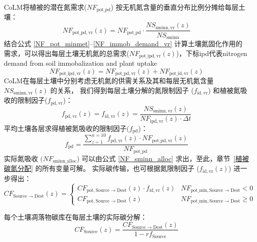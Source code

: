 CoLM将植被的潜在氮需求($NF_{\mathrm{pot\_{pd}}}$) 按无机氮含量的垂直分布比例分摊给每层土壤：
\begin{equation}
  NF_{\mathrm{pot\_{pd},vr}}(z)=NF_{\mathrm{pot\_{pd}}}\cdot\frac{NS_{\mathrm{sminn,vr}}(z)}{NS_{\mathrm{sminn}}}
\end{equation}
结合公式 \eqref{NF_pot_minmet}--\eqref{NF_immob_demand_vr} 计算土壤氮固化作用的需求，可以得出每层土壤无机氮的总需求($NF_{\mathrm{pot\_ipd,vr}}(z)$)，下标ipd代表nitrogen demand from soil immobalization and plant uptake
\begin{equation}
  NF_{\mathrm{pot\_ipd,vr}}(z)=NF_{\mathrm{pot\_{pd},vr}}(z)+NF_{\mathrm{pot\_id,vr}}\left(z\right)
\end{equation}
CoLM在每层土壤中分别考虑无机氮的供需关系及其和每层无机氮含量 ${NS}_{\mathrm{sminn,vr}}(z)$ 的关系，
我们得到每层土壤分解的氮限制因子 ($f_{\mathrm{id,vr}}$) 和植被氮吸收的限制因子($f_{\mathrm{pd,vr}}$)：
\begin{equation}
  f_{\mathrm{pd,vr}}(z)=f_{\mathrm{id,vr}}(z)=\frac{NS_{\mathrm{sminn,vr}}(z)}{NF_{\mathrm{ipd,vr}}(z)\cdot\Delta t}
\end{equation}
平均土壤各层求得植被氮吸收的限制因子($f_{\mathrm{pd}}$)：
\begin{equation}
  f_{\mathrm{pd}}=\frac{\sum_{z=1}^{n=10}{f_{\mathrm{pd,vr}}(z)\cdot NF_{\mathrm{pot\_{pd},vr}}(z)}}{NF_{\mathrm{pot\_{pd}}}}
\end{equation}
实际氮吸收 $(NF_{\mathrm{sminn\_{alloc}}}$) 可以由公式 \eqref{NF_sminn_alloc} 求出，至此，章节~\ref{植被碳氮分配} 的所有变量可解。
实际碳传输，也可根据氮限制因子 ($f_{\mathrm{id,vr}}(z)$) 进一步得出：
\begin{equation}
  CF_{\mathrm{Source \rightarrow { Dest }}}(z)=\left\{\begin{array}{ll}C F_{\mathrm{pot, Source \rightarrow Dest}}(z) \cdot f_{\mathrm{id, vr}}(z) & NF_{\mathrm{pot\_{min}, Source \rightarrow {Dest}}} <0 \\
      CF_{\mathrm{pot, Source \rightarrow { Dest }}}(z) & NF_{\mathrm{pot\_{min}, Source \rightarrow {Dest}}} \geqslant 0
  \end{array}\right.
\end{equation}

每个土壤凋落物碳库在每层土壤的实际碳分解：
\begin{equation}
  CF_{\mathrm{Source}}(z)=\frac{CF_{\mathrm{Source \rightarrow { Dest }}}(z)}{1-r f_{\mathrm{Source}}}
\end{equation}

